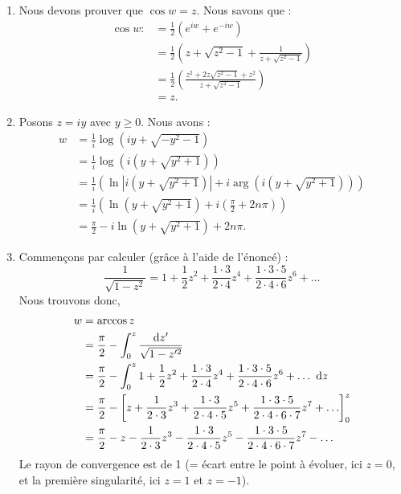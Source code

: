 {\begin{enumerate}
    \item
      Nous devons prouver que $\cos w = z$. Nous savons que :
      \begin{align*}
        \cos w :&= \frac{1}{2}(e^{iw}+e^{-iw})\\
                & = \frac{1}{2} \left( z+\sqrt{z^2-1}+\frac{1}{z+\sqrt{z^2-1}}\right)\\
                & = \frac{1}{2} \left(\frac{z^2+2z\sqrt{z^2-1}+z^2}{z+\sqrt{z^2-1}}\right)\\
                & = z.
      \end{align*}

    \item
      Posons $z=iy$ avec $y\geq 0$. Nous avons :
      \begin{align*}
        w &= \frac{1}{i}\log\left(iy+\sqrt{-y^2-1}\right)\\
          &= \frac{1}{i}\log\left(i(y+\sqrt{y^2+1})\right)\\
          &= \frac{1}{i}\left(\ln\left\vert i(y+\sqrt{y^2+1})\right\vert + i \arg\left(i(y+\sqrt{y^2+1})\right)\right)\\
          &= \frac{1}{i}\left(\ln\left(y+\sqrt{y^2+1}\right)+i\left(\frac{\pi}{2}+2n\pi\right)\right)\\
          &= \frac{\pi}{2} - i \ln\left(y+\sqrt{y^2+1}\right) +2n\pi.
      \end{align*}

    \item
      Commençons par calculer (grâce à l'aide de l'énoncé) :
      $$\frac{1}{\sqrt{1-z^2}} = 1 +\frac{1}{2}z^2 + \frac{1\cdot 3}{2\cdot 4}z^4 + \frac{1\cdot 3\cdot 5}{2\cdot 4\cdot 6}z^6+\ldots$$
      Nous trouvons donc,
      \begin{align*}
        w &= \arccos z \\
          & = \frac{\pi}{2}-\int_0^z\frac{\dif z'}{\sqrt{1-z'^2}}\\
          &= \frac{\pi}{2}-\int_0^z 1 +\frac{1}{2}z^2 + \frac{1\cdot 3}{2\cdot 4}z^4 + \frac{1\cdot 3\cdot 5}{2\cdot 4\cdot 6}z^6+\ldots \ \dif z\\
          &= \frac{\pi}{2}-\left[z +\frac{1}{2\cdot 3}z^3 + \frac{1\cdot 3}{2\cdot 4\cdot 5}z^5 + \frac{1\cdot 3\cdot 5}{2\cdot 4\cdot 6\cdot 7}z^7+\ldots\right]_0^z \\
          &= \frac{\pi}{2}- z -\frac{1}{2\cdot 3}z^3 - \frac{1\cdot 3}{2\cdot 4\cdot 5}z^5 - \frac{1\cdot 3\cdot 5}{2\cdot 4\cdot 6\cdot 7}z^7 - \ldots
      \end{align*}
      Le rayon de convergence est de 1 (= écart entre le point à évoluer, ici $z = 0$, et la première singularité, ici $z = 1$ et $z = -1$). 
  \end{enumerate}
}


